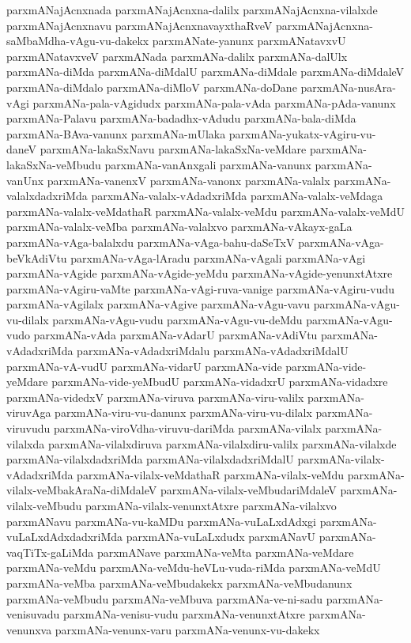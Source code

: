 {parxmANajAcnxnada
parxmANajAcnxna-dalilx
parxmANajAcnxna-vilalxde
parxmANajAcnxnavu
parxmANajAcnxnavayxthaRveV
parxmANajAcnxna-saMbaMdha-vAgu-vu-dakekx
parxmANate-yanunx
parxmANatavxvU
parxmANatavxveV
parxmANada
parxmANa-dalilx
parxmANa-dalUlx
parxmANa-diMda
parxmANa-diMdalU
parxmANa-diMdale
parxmANa-diMdaleV
parxmANa-diMdalo
parxmANa-diMloV
parxmANa-doDane
parxmANa-nusAra-vAgi
parxmANa-pala-vAgidudx
parxmANa-pala-vAda
parxmANa-pAda-vanunx
parxmANa-Palavu
parxmANa-badadhx-vAdudu
parxmANa-bala-diMda
parxmANa-BAva-vanunx
parxmANa-mUlaka
parxmANa-yukatx-vAgiru-vu-daneV
parxmANa-lakaSxNavu
parxmANa-lakaSxNa-veMdare
parxmANa-lakaSxNa-veMbudu
parxmANa-vanAnxgali
parxmANa-vanunx
parxmANa-vanUnx
parxmANa-vanenxV
parxmANa-vanonx
parxmANa-valalx
parxmANa-valalxdadxriMda
parxmANa-valalx-vAdadxriMda
parxmANa-valalx-veMdaga
parxmANa-valalx-veMdathaR
parxmANa-valalx-veMdu
parxmANa-valalx-veMdU
parxmANa-valalx-veMba
parxmANa-valalxvo
parxmANa-vAkayx-gaLa
parxmANa-vAga-balalxdu
parxmANa-vAga-bahu-daSeTxV
parxmANa-vAga-beVkAdiVtu
parxmANa-vAga-lAradu
parxmANa-vAgali
parxmANa-vAgi
parxmANa-vAgide
parxmANa-vAgide-yeMdu
parxmANa-vAgide-yenunxtAtxre
parxmANa-vAgiru-vaMte
parxmANa-vAgi-ruva-vanige
parxmANa-vAgiru-vudu
parxmANa-vAgilalx
parxmANa-vAgive
parxmANa-vAgu-vavu
parxmANa-vAgu-vu-dilalx
parxmANa-vAgu-vudu
parxmANa-vAgu-vu-deMdu
parxmANa-vAgu-vudo
parxmANa-vAda
parxmANa-vAdarU
parxmANa-vAdiVtu
parxmANa-vAdadxriMda
parxmANa-vAdadxriMdalu
parxmANa-vAdadxriMdalU
parxmANa-vA-vudU
parxmANa-vidarU
parxmANa-vide
parxmANa-vide-yeMdare
parxmANa-vide-yeMbudU
parxmANa-vidadxrU
parxmANa-vidadxre
parxmANa-videdxV
parxmANa-viruva
parxmANa-viru-valilx
parxmANa-viruvAga
parxmANa-viru-vu-danunx
parxmANa-viru-vu-dilalx
parxmANa-viruvudu
parxmANa-viroVdha-viruvu-dariMda
parxmANa-vilalx
parxmANa-vilalxda
parxmANa-vilalxdiruva
parxmANa-vilalxdiru-valilx
parxmANa-vilalxde
parxmANa-vilalxdadxriMda
parxmANa-vilalxdadxriMdalU
parxmANa-vilalx-vAdadxriMda
parxmANa-vilalx-veMdathaR
parxmANa-vilalx-veMdu
parxmANa-vilalx-veMbakAraNa-diMdaleV
parxmANa-vilalx-veMbudariMdaleV
parxmANa-vilalx-veMbudu
parxmANa-vilalx-venunxtAtxre
parxmANa-vilalxvo
parxmANavu
parxmANa-vu-kaMDu
parxmANa-vuLaLxdAdxgi
parxmANa-vuLaLxdAdxdadxriMda
parxmANa-vuLaLxdudx
parxmANavU
parxmANa-vaqTiTx-gaLiMda
parxmANave
parxmANa-veMta
parxmANa-veMdare
parxmANa-veMdu
parxmANa-veMdu-heVLu-vuda-riMda
parxmANa-veMdU
parxmANa-veMba
parxmANa-veMbudakekx
parxmANa-veMbudanunx
parxmANa-veMbudu
parxmANa-veMbuva
parxmANa-ve-ni-sadu
parxmANa-venisuvadu
parxmANa-venisu-vudu
parxmANa-venunxtAtxre
parxmANa-venunxva
parxmANa-venunx-varu
parxmANa-venunx-vu-dakekx
}
